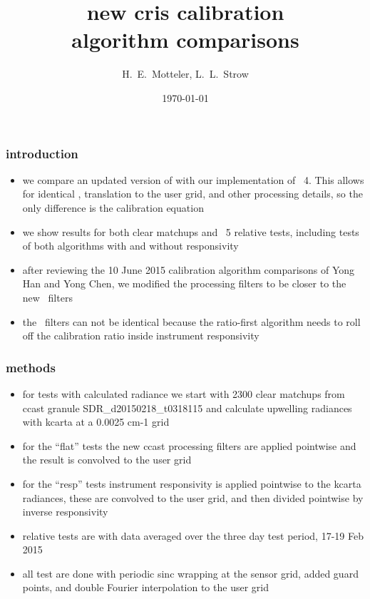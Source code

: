 \documentclass[11pt]{beamer}
\title{new cris calibration \\ 
       algorithm comparisons
}
\author{H.~E.~Motteler, L.~L.~Strow}
\institute{
  UMBC Atmospheric Spectroscopy Lab \\
  Joint Center for Earth Systems Technology \\
}
\date{\today}
\begin{document}
\begin{frame}[plain]
\titlepage
\end{frame}
\begin{frame}
\frametitle{introduction}

\begin{itemize}

  \item we compare an updated version of {\ccast} with our
    implementation of \noaa~4.  This allows for identical \ils,
    translation to the user grid, and other processing details,
    so the only difference is the calibration equation

  \item we show results for both clear matchups and \fov~5 relative
    tests, including tests of both algorithms with and without
    responsivity

  \item after reviewing the 10 June 2015 calibration algorithm
    comparisons of Yong Han and Yong Chen, we modified the {\ccast}
    processing filters to be closer to the new \noaa\ filters

  \item the \ccast\ filters can not be identical because the
    ratio-first algorithm needs to roll off the calibration ratio
    inside instrument responsivity

\end{itemize}

\end{frame}
\begin{frame}
\frametitle{methods}

\begin{itemize}

  \item for tests with calculated radiance we start with 2300 
    clear matchups from ccast granule SDR\_d20150218\_t0318115 and
    calculate upwelling radiances with kcarta at a 0.0025 cm-1 grid

  \item for the ``flat'' tests the new ccast processing filters are
    applied pointwise and the result is convolved to the {\cris}
    user grid

  \item for the ``resp'' tests instrument responsivity is applied
    pointwise to the kcarta radiances, these are convolved to the
    user grid, and then divided pointwise by inverse responsivity

  \item relative tests are with data averaged over the three day
    test period, 17-19 Feb 2015
    
  \item all test are done with periodic sinc wrapping at the sensor
    grid, added guard points, and double Fourier interpolation to
    the user grid

\end{itemize}

\end{frame}
\end{document}
